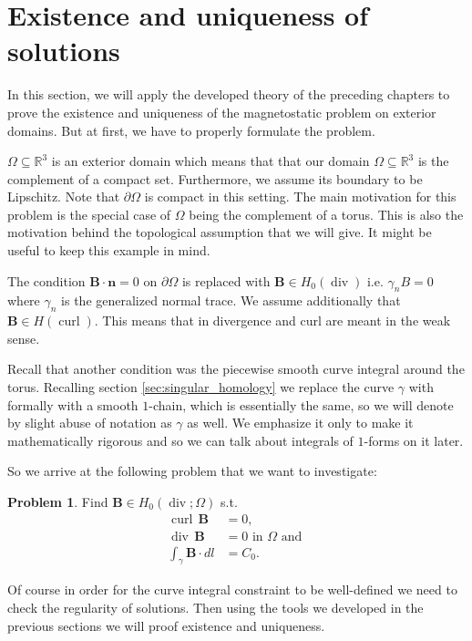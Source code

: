 \documentclass[12pt,a4paper]{article}
\numberwithin{equation}{subsection}
\numberwithin{lemma}{subsection}
\theoremstyle{definition}
\newtheorem{problem}[lemma]{Problem}
\DeclareMathOperator{\curl}{curl}
\DeclareMathOperator{\diver}{div}
\newcommand{\real}{\mathbb{R}}
\begin{document}
\section{Existence and uniqueness of solutions}\label{sec:existence_and_uniqueness}

In this section, we will apply the developed theory of the preceding chapters
to prove the existence and uniqueness of the magnetostatic problem 
on exterior domains. But at first, we have to properly formulate the problem.

$\Omega \subseteq \real^3$ is an exterior domain which means that 
that our domain $\Omega \subseteq \real^3$
is the complement of a compact set. Furthermore, we assume its boundary to be 
Lipschitz. Note that $\partial \Omega$ is compact in this setting.
The main motivation for this problem is 
the special case of $\Omega$ being the complement of a torus. 
This is also the motivation behind the
topological assumption that we will give. It might be useful to keep this
example in mind.

The condition $\mathbf{B}\cdot \mathbf{n} = 0$ on $\partial\Omega$ is replaced
with $\mathbf{B} \in H_0(\diver)$ i.e. $\gamma_n B = 0$ where 
$\gamma_n$ is the generalized normal trace. We assume additionally that 
$\mathbf{B} \in H(\curl)$. This means that in divergence and curl are meant in 
the weak sense.

Recall that another condition was the piecewise smooth curve integral around the torus.
Recalling section \ref{sec:singular_homology} we replace the curve $\gamma$
with formally with a smooth $1$-chain, which is essentially the same, so we will 
denote by slight abuse of notation as $\gamma$ as well. We emphasize 
it only to make it mathematically rigorous and so we can talk about integrals 
of $1$-forms on it later.

So we arrive at the following problem that we want to investigate:
\begin{problem}\label{prob:magnetostatic_problem}
    Find $\mathbf{B} \in H_0(\diver;\Omega)$ s.t.
    \begin{align}
        \curl \, \mathbf{B} &= 0, \\ 
        \diver \, \mathbf{B}  &= 0 \text{ in } \Omega \text{ and }\\
        \int_\gamma \mathbf{B} \cdot dl &= C_0.
    \end{align}
\end{problem}

Of course in order for the curve integral constraint to be well-defined 
we need to check the regularity of solutions. Then using the tools we developed
in the previous sections we will proof existence and uniqueness.
\end{document}
